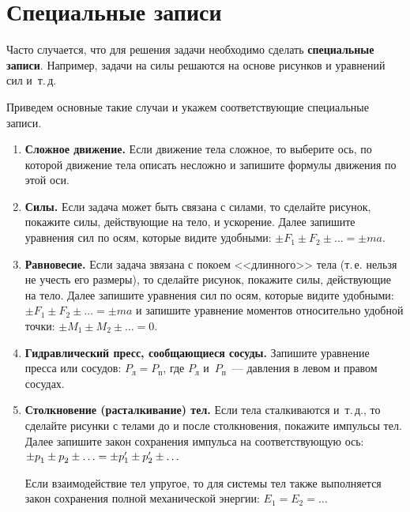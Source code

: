 \documentclass[main.tex]{subfiles}
\begin{document}

\pagestyle{empty}


 
   


\section{Специальные записи}

Часто случается, что для решения задачи необходимо сделать \textbf{специальные записи}. Например, задачи на силы решаются на основе рисунков и уравнений сил и~т.\,д. 

Приведем основные такие случаи и укажем соответствующие специальные записи.

\begin{enumerate}
    \item \textbf{Сложное движение.} Если движение тела сложное, то выберите ось, по которой движение тела описать несложно и запишите формулы движения по этой оси.  
    
    \item \textbf{Силы.} Если задача может быть связана с силами, то сделайте рисунок, покажите силы, действующие на тело, и ускорение. Далее запишите уравнения сил по осям, которые видите удобными: $\pm F_1\pm F_2\pm\ldots=\pm ma$.
    
    \item \textbf{Равновесие.} Если задача звязана с покоем <<длинного>> тела (т.\,е. нельзя не учесть его размеры), то сделайте рисунок, покажите силы, действующие на тело. Далее запишите уравнения сил по осям, которые видите удобными: $\pm F_1\pm F_2\pm\ldots=\pm ma$ и запишите уравнение моментов относительно удобной точки: $\pm M_1\pm M_2\pm\ldots=0$.  
    
    \item \textbf{Гидравлический пресс, сообщающиеся сосуды.} Запишите уравнение пресса или сосудов: $P_\text{л}=P_\text{п}$, где $P_\text{л}$ и~$P_\text{п}$~--- давления в левом и правом сосудах.

    \item \textbf{Столкновение (расталкивание) тел.} Если тела сталкиваются и~т.\,д., то сделайте рисунки с телами до и после столкновения, покажите импульсы тел. Далее запишите закон сохранения импульса на соответствующую ось: $\pm p^{\vphantom{'}}_\text{1} \pm p^{\vphantom{'}}_\text{2}\pm\ldots\hm = \pm p'_{1} \pm p'_{2}\pm\ldots$
    
    Если взаимодействие тел упругое, то для системы тел также выполняется закон сохранения полной механической энергии: $E_1=E_2=\ldots$


\end{enumerate}
\end{document}
